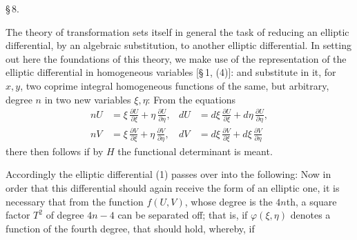 \begin{center}
\S\,8. \textbf{}
\end{center}

The  theory of transformation sets itself in general the task of
reducing an elliptic differential, by an algebraic substitution, to
another elliptic differential. In setting out here the foundations of
this theory, we make use of the representation of the elliptic
differential in homogeneous variables [\S\,1, (4)]:
and substitute in it, for $x,y$, two coprime integral homogeneous
functions of the same, but arbitrary, degree $n$ in two new variables
$\xi,\eta$:
From the equations
\[
\begin{aligned}
nU &= \xi\,\frac{\partial U}{\partial \xi} + \eta\,\frac{\partial U}{\partial \eta}, &
dU &= d\xi\,\frac{\partial U}{\partial \xi} + d\eta\,\frac{\partial U}{\partial \eta},\\
nV &= \xi\,\frac{\partial V}{\partial \xi} + \eta\,\frac{\partial V}{\partial \eta}, &
dV &= d\xi\,\frac{\partial V}{\partial \xi} + d\xi\,\frac{\partial V}{\partial \eta} %
\end{aligned}
\]
there then follows
if by $H$ the functional determinant
is meant.

Accordingly the elliptic differential (1) passes over into the following:
Now in order that this differential should again receive the form of an
elliptic one, it is necessary that from the function $f(U,V)$, whose
degree is the $4n$th, a square factor $T^2$ of degree $4n-4$ can be
separated off; that is, if $\varphi(\xi,\eta)$ denotes a function of the
fourth degree, that
should hold, whereby, if
